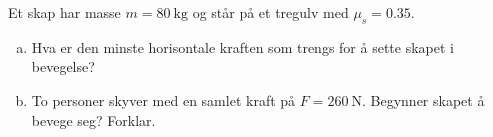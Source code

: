 %
Et skap har masse $m = \SI{80}{\kilo\gram}$ og står på et tregulv med $\mu_s = 0.35$.
\begin{enumerate}[a)]
    \item Hva er den minste horisontale kraften som trengs for å sette skapet i bevegelse?
    \item To personer skyver med en samlet kraft på $F = \SI{260}{\newton}$. Begynner skapet å bevege seg? Forklar.
\end{enumerate}
